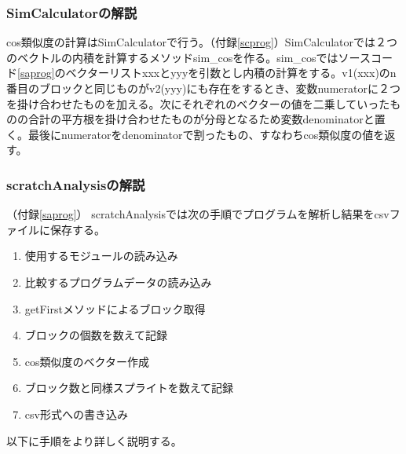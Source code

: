 \documentclass[a4paper,10pt,onecolumn,oneside,openany]{jsbook}
\begin{document}
\subsubsection{SimCalculatorの解説}
cos類似度の計算はSimCalculatorで行う。（付録\ref{scprog}）SimCalculatorでは２つのベクトルの内積を計算するメソッドsim\_cosを作る。sim\_cosではソースコード\ref{saprog}のベクターリストxxxとyyyを引数とし内積の計算をする。v1(xxx)のn番目のブロックと同じものがv2(yyy)にも存在をするとき、変数numeratorに２つを掛け合わせたものを加える。次にそれぞれのベクターの値を二乗していったものの合計の平方根を掛け合わせたものが分母となるため変数denominatorと置く。最後にnumeratorをdenominatorで割ったもの、すなわちcos類似度の値を返す。

\subsubsection{scratchAnalysisの解説}（付録\ref{saprog}）
scratchAnalysisでは次の手順でプログラムを解析し結果をcsvファイルに保存する。
\begin{enumerate}
  \item 使用するモジュールの読み込み
  \item 比較するプログラムデータの読み込み
  \item getFirstメソッドによるブロック取得
  \item ブロックの個数を数えて記録
  \item cos類似度のベクター作成
  \item ブロック数と同様スプライトを数えて記録
  \item csv形式への書き込み
\end{enumerate}
以下に手順をより詳しく説明する。
\end{document}
